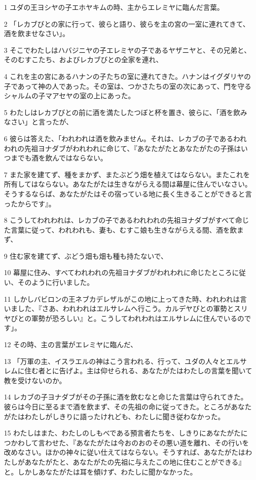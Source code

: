 \par 1 ユダの王ヨシヤの子エホヤキムの時、主からエレミヤに臨んだ言葉。
\par 2 「レカブびとの家に行って、彼らと語り、彼らを主の宮の一室に連れてきて、酒を飲ませなさい」。
\par 3 そこでわたしはハバジニヤの子エレミヤの子であるヤザニヤと、その兄弟と、そのむすこたち、およびレカブびとの全家を連れ、
\par 4 これを主の宮にあるハナンの子たちの室に連れてきた。ハナンはイグダリヤの子であって神の人であった。その室は、つかさたちの室の次にあって、門を守るシャルムの子マアセヤの室の上にあった。
\par 5 わたしはレカブびとの前に酒を満たしたつぼと杯を置き、彼らに、「酒を飲みなさい」と言ったが、
\par 6 彼らは答えた、「われわれは酒を飲みません。それは、レカブの子であるわれわれの先祖ヨナダブがわれわれに命じて、『あなたがたとあなたがたの子孫はいつまでも酒を飲んではならない。
\par 7 また家を建てず、種をまかず、またぶどう畑を植えてはならない。またこれを所有してはならない。あなたがたは生きながらえる間は幕屋に住んでいなさい。そうするならば、あなたがたはその宿っている地に長く生きることができると言ったからです』。
\par 8 こうしてわれわれは、レカブの子であるわれわれの先祖ヨナダブがすべて命じた言葉に従って、われわれも、妻も、むすこ娘も生きながらえる間、酒を飲まず、
\par 9 住む家を建てず、ぶどう畑も畑も種も持たないで、
\par 10 幕屋に住み、すべてわれわれの先祖ヨナダブがわれわれに命じたところに従い、そのように行いました。
\par 11 しかしバビロンの王ネブカデレザルがこの地に上ってきた時、われわれは言いました、『さあ、われわれはエルサレムへ行こう。カルデヤびとの軍勢とスリヤびとの軍勢が恐ろしい』と。こうしてわれわれはエルサレムに住んでいるのです」。
\par 12 その時、主の言葉がエレミヤに臨んだ、
\par 13 「万軍の主、イスラエルの神はこう言われる、行って、ユダの人々とエルサレムに住む者とに告げよ。主は仰せられる、あなたがたはわたしの言葉を聞いて教を受けないのか。
\par 14 レカブの子ヨナダブがその子孫に酒を飲むなと命じた言葉は守られてきた。彼らは今日に至るまで酒を飲まず、その先祖の命に従ってきた。ところがあなたがたはわたしがしきりに語ったけれども、わたしに聞き従わなかった。
\par 15 わたしはまた、わたしのしもべである預言者たちを、しきりにあなたがたにつかわして言わせた、『あなたがたは今おのおのその悪い道を離れ、その行いを改めなさい。ほかの神々に従い仕えてはならない。そうすれば、あなたがたはわたしがあなたがたと、あなたがたの先祖に与えたこの地に住むことができる』と。しかしあなたがたは耳を傾けず、わたしに聞かなかった。
